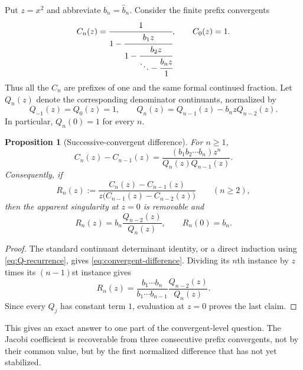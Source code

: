 \documentclass[11pt]{article}
\newtheorem{proposition}[theorem]{Proposition}
\theoremstyle{remark}
\begin{document}
Put $z=x^2$ and abbreviate $b_n=\widehat b_n$.  Consider the finite prefix
convergents
\begin{equation}
 C_n(z)=
 \cfrac{1}{1-\cfrac{b_1z}{1-\cfrac{b_2z}{\ddots-
 \cfrac{b_nz}{1}}}},
 \qquad C_0(z)=1.
 \label{eq:zero-diagonal-convergents}
\end{equation}
Thus all the $C_n$ are prefixes of one and the same formal continued fraction.
Let $Q_n(z)$ denote the corresponding denominator continuants, normalized by
\begin{equation}
 Q_{-1}(z)=Q_0(z)=1,\qquad
 Q_n(z)=Q_{n-1}(z)-b_nzQ_{n-2}(z).
 \label{eq:Q-recurrence}
\end{equation}
In particular, $Q_n(0)=1$ for every $n$.

\begin{proposition}[Successive-convergent difference]
For $n\geq1$,
\begin{equation}
 C_n(z)-C_{n-1}(z)
 =\frac{(b_1b_2\cdots b_n)z^n}{Q_n(z)Q_{n-1}(z)}.
 \label{eq:convergent-difference}
\end{equation}
Consequently, if
\begin{equation}
 R_n(z):=
 \frac{C_n(z)-C_{n-1}(z)}
 {z\bigl(C_{n-1}(z)-C_{n-2}(z)\bigr)}
 \qquad(n\geq2),
 \label{eq:Rn-definition}
\end{equation}
then the apparent singularity at $z=0$ is removable and
\begin{equation}
 R_n(z)=b_n\frac{Q_{n-2}(z)}{Q_n(z)},
 \qquad R_n(0)=b_n.
 \label{eq:Rn-exact}
\end{equation}
\end{proposition}

\begin{proof}
The standard continuant determinant identity, or a direct induction using
\eqref{eq:Q-recurrence}, gives \eqref{eq:convergent-difference}.  Dividing its
$n$th instance by $z$ times its $(n-1)$st instance gives
\[
 R_n(z)=
 \frac{b_1\cdots b_n}{b_1\cdots b_{n-1}}
 \frac{Q_{n-2}(z)}{Q_n(z)}.
\]
Since every $Q_j$ has constant term $1$, evaluation at $z=0$ proves the last
claim.
\end{proof}

This gives an exact answer to one part of the convergent-level question.  The
Jacobi coefficient is recoverable from three consecutive prefix convergents,
not by their common value, but by the first normalized difference that has not
yet stabilized.
\end{document}
